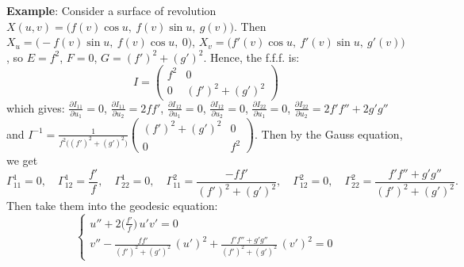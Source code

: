 \noindent\textbf{Example}: Consider a surface of revolution $X(u, v) = \big(f(v)\cos u,\ f(v)\sin u,\ g(v)\big)$. Then $X_u = \big(-f(v)\sin u,\ f(v)\cos u,\ 0\big)$, $X_v = \big(f'(v)\cos u,\ f'(v)\sin u,\ g'(v)\big)$, so $E = f^2$, $F = 0$, $G = (f')^2 + (g')^2$. Hence, the f.f.f. is:
\[
I = \begin{pmatrix}f^2 & 0\\ 0 & (f')^2 + (g')^2\end{pmatrix}
\]
which gives: $\frac{\partial I_{11}}{\partial u_1} = 0$, $\frac{\partial I_{11}}{\partial u_2} = 2ff'$, $\frac{\partial I_{12}}{\partial u_1} = 0$, $\frac{\partial I_{12}}{\partial u_2} = 0$, $\frac{\partial I_{22}}{\partial u_1} = 0$, $\frac{\partial I_{22}}{\partial u_2} = 2f'f'' + 2g'g''$ and $I^{-1} = \frac{1}{f^2\big((f')^2 + (g')^2\big)}\begin{pmatrix}(f')^2 + (g')^2 & 0\\ 0 & f^2\end{pmatrix}$. Then by the Gauss equation, we get
\[
\Gamma_{11}^1 = 0,  \quad \Gamma_{12}^1 = \frac{f'}{f}, \quad \Gamma_{22}^1 = 0, \quad \Gamma_{11}^2 = \frac{-ff'}{(f')^2 + (g')^2}, \quad \Gamma_{12}^2 = 0, \quad \Gamma_{22}^2 = \frac{f'f'' + g'g''}{(f')^2 + (g')^2}.
\]
Then take them into the geodesic equation:
\[
\begin{cases}
u'' + 2\big(\frac{f'}{f}\big)\,u'v' = 0\\[2mm]
v'' - \frac{ff'}{(f')^2 + (g')^2}\,(u')^2 + \frac{f'f'' + g'g''}{(f')^2 + (g')^2}\,(v')^2 = 0
\end{cases}
\]

